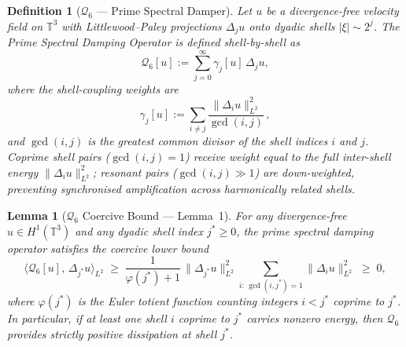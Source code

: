 \documentclass[11pt]{article}
\newtheorem{lemma}[theorem]{Lemma}
\newtheorem{definition}[theorem]{Definition}
\begin{document}
\begin{definition}[$\mathcal{Q}_6$ --- Prime Spectral Damper]\label{def:Q6}
Let $u$ be a divergence-free velocity field on $\mathbb{T}^3$ with
Littlewood--Paley projections $\Delta_j u$ onto dyadic shells $|\xi|\sim 2^j$.
The \emph{Prime Spectral Damping Operator} is defined shell-by-shell as
\[
  \mathcal{Q}_6[u] := \sum_{j=0}^{\infty} \gamma_j[u]\,\Delta_j u,
\]
where the shell-coupling weights are
\[
  \gamma_j[u] := \sum_{i \neq j} \frac{\|\Delta_i u\|_{L^2}^2}{\gcd(i,j)}\,,
\]
and $\gcd(i,j)$ is the greatest common divisor of the shell indices $i$ and $j$.
Coprime shell pairs ($\gcd(i,j)=1$) receive weight equal to
the full inter-shell energy $\|\Delta_i u\|_{L^2}^2$;
resonant pairs ($\gcd(i,j)\gg 1$) are down-weighted, preventing
synchronised amplification across harmonically related shells.
\end{definition}

\begin{lemma}[$\mathcal{Q}_6$ Coercive Bound --- Lemma~1]\label{lem:Q6coercive}
For any divergence-free $u \in H^1(\mathbb{T}^3)$ and any dyadic shell index
$j^* \geq 0$, the prime spectral damping operator satisfies the
\emph{coercive lower bound}
\begin{equation}\label{eq:Q6coercive}
  \langle \mathcal{Q}_6[u],\, \Delta_{j^*} u \rangle_{L^2}
  \;\geq\;
  \frac{1}{\varphi(j^*)+1}\,\|\Delta_{j^*} u\|_{L^2}^2
  \sum_{i:\,\gcd(i,j^*)=1} \|\Delta_i u\|_{L^2}^2
  \;\geq\; 0,
\end{equation}
where $\varphi(j^*)$ is the Euler totient function counting integers
$i < j^*$ coprime to $j^*$.
In particular, if at least one shell $i$ coprime to $j^*$ carries
nonzero energy, then $\mathcal{Q}_6$ provides strictly positive dissipation
at shell $j^*$.
\end{lemma}
\end{document}
